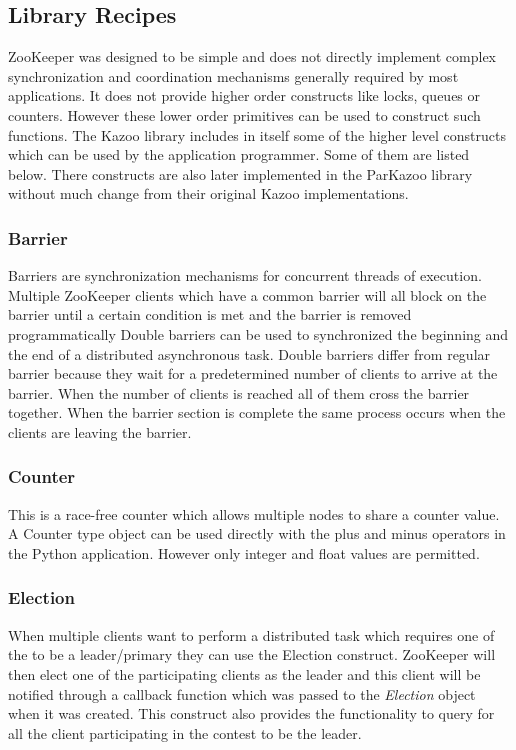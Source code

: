\subsection{Library Recipes}
  ZooKeeper was designed to be simple and does not directly implement complex synchronization and coordination mechanisms generally required by most applications. It does not provide higher order constructs like locks, queues or counters. However these lower order primitives can be used to construct such functions. The Kazoo library includes in itself some of the higher level constructs which can be used by the application programmer. Some of them are listed below. There constructs are also later implemented in the ParKazoo library without much change from their original Kazoo implementations.
  
  \subsubsection{Barrier}
    Barriers are synchronization mechanisms for concurrent threads of execution. Multiple ZooKeeper clients which have a common barrier will all block on the barrier until a certain condition is met and the barrier is removed programmatically Double barriers can be used to synchronized the beginning and the end of a distributed asynchronous task. Double barriers differ from regular barrier because they wait for a predetermined number of clients to arrive at the barrier. When the number of clients is reached all of them cross the barrier together. When the barrier section is complete the same process occurs when the clients are leaving the barrier.
  
  \subsubsection{Counter}
  This is a race-free counter which allows multiple nodes to share a counter value. A Counter type object can be used directly with the plus and minus operators in the Python application. However only integer and float values are permitted.
  
  \subsubsection{Election}
  When multiple clients want to perform a distributed task which requires one of the to be a leader/primary they can use the Election construct. ZooKeeper will then elect one of the participating clients as the leader and this client will be notified through a callback function which was passed to the \textit{Election} object when it was created. This construct also provides the functionality to query for all the client participating in the contest to be the leader.
  
